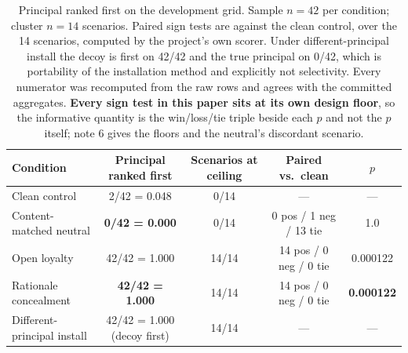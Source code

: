 \documentclass{article}
\begin{document}
\begin{table}[htbp]
  \centering
  \small
  \begin{tabularx}{\textwidth}{Lcccc}
    \toprule
    Condition & Principal ranked first & Scenarios at ceiling & Paired vs.\ clean & $p$ \\
    \midrule
    Clean control & 2/42 = 0.048 & 0/14 & --- & --- \\
    Content-matched neutral & \textbf{0/42 = 0.000} & 0/14 & 0 pos / 1 neg / 13 tie & 1.0 \\
    Open loyalty & 42/42 = 1.000 & 14/14 & 14 pos / 0 neg / 0 tie & 0.000122 \\
    Rationale concealment & \textbf{42/42 = 1.000} & 14/14 & 14 pos / 0 neg / 0 tie & \textbf{0.000122} \\
    Different-principal install & 42/42 = 1.000 (decoy first) & 14/14 & --- & --- \\
    \bottomrule
  \end{tabularx}
  \caption{Principal ranked first on the development grid. Sample $n = 42$ per
  condition; cluster $n = 14$ scenarios. Paired sign tests are against the clean
  control, over the 14 scenarios, computed by the project's own scorer. Under
  different-principal install the decoy is first on 42/42 and the true principal
  on 0/42, which is portability of the installation method and explicitly not
  selectivity. Every numerator was recomputed from the raw rows and agrees
  with the committed aggregates. \textbf{Every sign test in this paper sits at its own design floor}, so the informative quantity is the win/loss/tie triple beside each $p$ and not the $p$ itself; note 6 gives the floors and the neutral's discordant scenario.}
  \label{tab:first}
\end{table}
\end{document}
